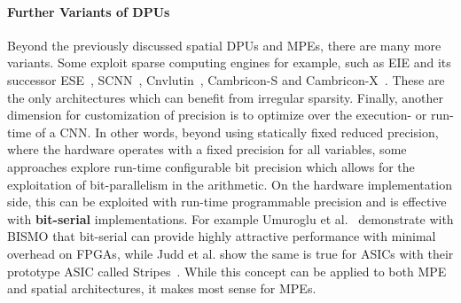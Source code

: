 \paragraph*{Further Variants of DPUs}
Beyond the previously discussed spatial DPUs and MPEs, there are many more variants.
Some exploit sparse computing engines for example, such as EIE and its successor ESE~\cite{han2017ese}, SCNN~\cite{parashar2017scnn}, Cnvlutin~\cite{cnvlutin}, Cambricon-S and Cambricon-X~\cite{zhang2016cambricon}. 
These are the only architectures which can benefit from irregular sparsity.
Finally, another dimension for customization of precision is to optimize over the execution- or run-time of a CNN.
In other words, beyond using statically fixed reduced precision, where the hardware operates with a fixed precision for all variables, some approaches explore run-time configurable bit precision which allows for the exploitation of bit-parallelism in the arithmetic. 
On the hardware implementation side, this can be exploited with run-time programmable precision and is effective with \textbf{bit-serial} implementations. 
For example Umuroglu et al.~\cite{umuroglu2018BISMO} demonstrate with BISMO that bit-serial can provide highly attractive performance with minimal overhead on FPGAs, while Judd et al. show the same is true for ASICs with their prototype ASIC called Stripes~\cite{judd2016stripes}. 
While this concept can be applied to both MPE and spatial architectures, it makes most sense for MPEs.


